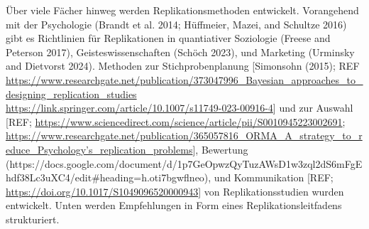\documentclass[
  letterpaper,
  DIV=11,
  numbers=noendperiod]{scrreprt}
\begin{document}
Über viele Fächer hinweg werden Replikationsmethoden entwickelt.
Vorangehend mit der Psychologie (Brandt et al. 2014; Hüffmeier, Mazei,
and Schultze 2016) gibt es Richtlinien für Replikationen in quantiativer
Soziologie (Freese and Peterson 2017), Geisteswissenschaften (Schöch
2023), und Marketing (Urminsky and Dietvorst 2024). Methoden zur
Stichprobenplanung {[}Simonsohn (2015); REF
\url{https://www.researchgate.net/publication/373047996_Bayesian_approaches_to_designing_replication_studies}\\
\url{https://link.springer.com/article/10.1007/s11749-023-00916-4}{]}
und zur Auswahl {[}REF;
\url{https://www.sciencedirect.com/science/article/pii/S0010945223002691};
\href{https://www.researchgate.net/publication/365057816_ORMA_A_strategy_to_reduce_Psychology's_replication_problems}{https://www.researchgate.net/publication/365057816\_ORMA\_A\_strategy\_to\_reduce\_Psychology's\_replication\_problems}{]},
Bewertung
(https://docs.google.com/document/d/1p7GeOpwzQyTuzAWsD1w3zql2dS6mFgEhdf38Lc3uXC4/edit\#heading=h.oti7bgwflneo),
und Kommunikation {[}REF;
\url{https://doi.org/10.1017/S1049096520000943}{]} von
Replikationsstudien wurden entwickelt. Unten werden Empfehlungen in Form
eines Replikationsleitfadens strukturiert.
\end{document}
